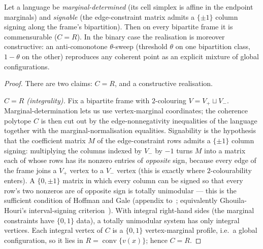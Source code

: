 \begin{theorem}\label{thm:taming7}
Let a language be \emph{marginal-determined} (its cell simplex is affine in the
endpoint marginals) and \emph{signable} (the edge-constraint matrix admits a
$\{\pm1\}$ column signing along the frame's bipartition). Then on every bipartite
frame it is commensurable ($C=R$). In the binary case the realisation is
moreover constructive: an anti-comonotone $\theta$-sweep (threshold $\theta$ on
one bipartition class, $1-\theta$ on the other) reproduces any coherent point as
an explicit mixture of global configurations.
\end{theorem}

\begin{proof}
There are two claims: $C=R$, and a constructive realisation.

\emph{$C=R$ (integrality).} Fix a bipartite frame with $2$-colouring
$V=V_+\sqcup V_-$. Marginal-determination lets us use vertex-marginal
coordinates; the coherence polytope $C$ is then cut out by the edge-nonnegativity
inequalities of the language together with the marginal-normalisation equalities.
Signability is the hypothesis that the coefficient matrix $M$ of the
edge-constraint rows admits a $\{\pm1\}$ column signing: multiplying the columns
indexed by $V_-$ by $-1$ turns $M$ into a matrix each of whose rows has its
nonzero entries of \emph{opposite} sign, because every edge of the frame joins a
$V_+$ vertex to a $V_-$ vertex (this is exactly where $2$-colourability enters).
A $\{0,\pm1\}$ matrix in which every column can be signed so that every row's two
nonzeros are of opposite sign is totally unimodular --- this is the sufficient
condition of Hoffman and Gale (appendix
to~\cite{HellerTompkins1956}; equivalently Ghouila-Houri's
interval-signing criterion~\cite{GhouilaHouri1962}). With integral right-hand
sides (the marginal constraints have $\{0,1\}$ data), a totally unimodular system
has only integral vertices. Each integral vertex of $C$ is a $\{0,1\}$
vertex-marginal profile, i.e.\ a global configuration, so it lies in
$R=\operatorname{conv}\{v(x)\}$; hence $C=R$.


\end{proof}
